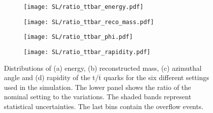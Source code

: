 \begin{figure}[H]
    \centering
    \begin{subfigure}{0.49\textwidth}
        \centering
        \texttt{[image: SL/ratio\_ttbar\_energy.pdf]}
        \caption{}
        \label{app:subfig:E(t,tbar)_SL}
    \end{subfigure}
    \begin{subfigure}{0.48\textwidth}
        \centering
        \texttt{[image: SL/ratio\_ttbar\_reco\_mass.pdf]}
        \caption{}
        \label{app:subfig:m(t,tbar)_SL}
    \end{subfigure}

    \vspace{0.2cm}
    
    \begin{subfigure}{0.49\textwidth}
        \centering
        \texttt{[image: SL/ratio\_ttbar\_phi.pdf]}
        \caption{}
        \label{app:subfig:phi(t,tbar)_SL}
    \end{subfigure}
    \begin{subfigure}{0.49\textwidth}
        \centering
        \texttt{[image: SL/ratio\_ttbar\_rapidity.pdf]}
        \caption{}
        \label{app:subfig:y(t,tbar)_SL}
    \end{subfigure}
    
    \caption{Distributions of (a) energy, (b) reconstructed mass,  (c) azimuthal angle and (d) rapidity of the t/$\overline{\text{t}}$ quarks for the six different settings used in the simulation. The lower panel shows the ratio of the nominal setting to the variations. The shaded bands represent statistical uncertainties. The last bins contain the overflow events.}
    \label{app:fig:t,tbar_SL}
\end{figure}


